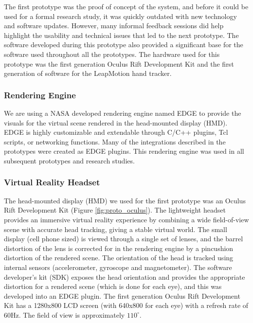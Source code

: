 The first prototype was the proof of concept of the system, and before it could be used for a formal research study, it was quickly outdated with new technology and software updates.
However, many informal feedback sessions did help highlight the usability and technical issues that led to the next prototype.
The software developed during this prototype also provided a significant base for the software used throughout all the prototypes.
The hardware used for this prototype was the first generation Oculus Rift Development Kit and the first generation of software for the LeapMotion hand tracker.

\subsubsection{Rendering Engine}

We are using a NASA developed rendering engine named EDGE to provide the visuals for the virtual scene rendered in the head-mounted display (HMD).
EDGE is highly customizable and extendable through C/C++ plugins, Tcl scripts, or networking functions.
Many of the integrations described in the prototypes were created as EDGE plugins.
This rendering engine was used in all subsequent prototypes and research studies.

\subsubsection{Virtual Reality Headset}

The head-mounted display (HMD) we used for the first prototype was an Oculus Rift Development Kit (Figure \ref{fig:proto_oculus}).
The lightweight headset provides an immersive virtual reality experience by combining a wide field-of-view scene with accurate head tracking, giving a stable virtual world.
The small display (cell phone sized) is viewed through a single set of lenses, and the barrel distortion of the lens is corrected for in the rendering engine by a pincushion distortion of the rendered scene.
The orientation of the head is tracked using internal sensors (accelerometer, gyroscope and magnetometer).
The software developer’s kit (SDK) exposes the head orientation and provides the appropriate distortion for a rendered scene (which is done for each eye), and this was developed into an EDGE plugin.
The first generation Oculus Rift Development Kit has a 1280x800 LCD screen (with 640x800 for each eye) with a refresh rate of 60Hz.
The field of view is approximately $110^{\circ}$.

